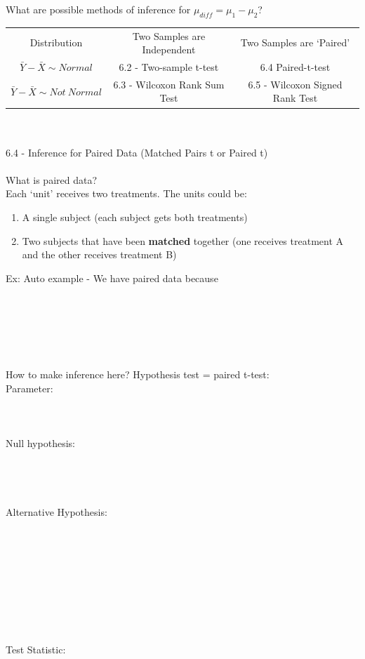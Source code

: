\newpage

What are possible methods of inference for $\mu_{diff}=\mu_1-\mu_2$?
\begin{center}
\begin{tabular}{c|c|c}
Distribution & Two Samples are Independent & Two Samples are `Paired'\vspace{5pt}\\
$\bar{Y}-\bar{X}\sim Normal$ &  6.2 - Two-sample t-test & 6.4 Paired-t-test\\\vspace{5pt}
$\bar{Y}-\bar{X}\sim Not~Normal$ & 6.3 - Wilcoxon Rank Sum Test & 6.5 - Wilcoxon Signed Rank Test
\end{tabular}
\end{center}
~\\~\\
\Large 6.4 - Inference for Paired Data (Matched Pairs t or Paired t)\normalsize\\~\\

What is paired data?\\
Each `unit' receives two treatments. The units could be: 
\begin{enumerate}
\item A single subject (each subject gets both treatments) 
\item	Two subjects that have been \textbf{matched} together (one receives treatment A and the other receives treatment B) 
\end{enumerate}

Ex: Auto example - We have paired data because\\~\\~\\~\\~\\~\\~\\

How to make inference here?  Hypothesis test = paired t-test:\\
Parameter:\\~\\~\\~\\
Null hypothesis:\\~\\~\\~\\~\\
Alternative Hypothesis:\\~\\~\\~\\~\\~\\~\\~\\~\\~\\
Test Statistic:

